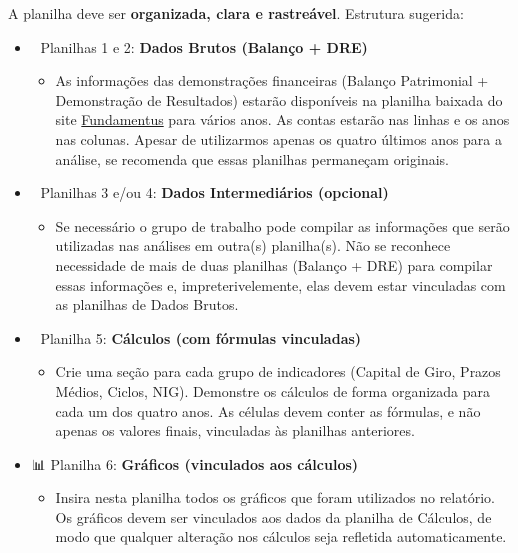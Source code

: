 \documentclass[
  a4paper,
]{book}
\providecommand{\tightlist}{%
  \setlength{\itemsep}{0pt}\setlength{\parskip}{0pt}}\usepackage{longtable,booktabs,array}
\begin{document}
A planilha deve ser \textbf{organizada, clara e rastreável}. Estrutura
sugerida:

\begin{itemize}
\tightlist
\item
  📂 Planilhas 1 e 2: \textbf{Dados Brutos (Balanço + DRE)}

  \begin{itemize}
  \tightlist
  \item
    As informações das demonstrações financeiras (Balanço Patrimonial +
    Demonstração de Resultados) estarão disponíveis na planilha baixada
    do site \href{https://www.fundamentus.com.br}{Fundamentus} para
    vários anos. As contas estarão nas linhas e os anos nas colunas.
    Apesar de utilizarmos apenas os quatro últimos anos para a análise,
    se recomenda que essas planilhas permaneçam originais.\\
  \end{itemize}
\item
  📂 Planilhas 3 e/ou 4: \textbf{Dados Intermediários (opcional)}

  \begin{itemize}
  \tightlist
  \item
    Se necessário o grupo de trabalho pode compilar as informações que
    serão utilizadas nas análises em outra(s) planilha(s). Não se
    reconhece necessidade de mais de duas planilhas (Balanço + DRE) para
    compilar essas informações e, impreterivelemente, elas devem estar
    vinculadas com as planilhas de Dados Brutos.\\
  \end{itemize}
\item
  📂 Planilha 5: \textbf{Cálculos (com fórmulas vinculadas)}

  \begin{itemize}
  \tightlist
  \item
    Crie uma seção para cada grupo de indicadores (Capital de Giro,
    Prazos Médios, Ciclos, NIG). Demonstre os cálculos de forma
    organizada para cada um dos quatro anos. As células devem conter as
    fórmulas, e não apenas os valores finais, vinculadas às planilhas
    anteriores.\\
  \end{itemize}
\item
  📊 Planilha 6: \textbf{Gráficos (vinculados aos cálculos)}

  \begin{itemize}
  \tightlist
  \item
    Insira nesta planilha todos os gráficos que foram utilizados no
    relatório. Os gráficos devem ser vinculados aos dados da planilha de
    Cálculos, de modo que qualquer alteração nos cálculos seja refletida
    automaticamente.
  \end{itemize}
\end{itemize}
\end{document}
